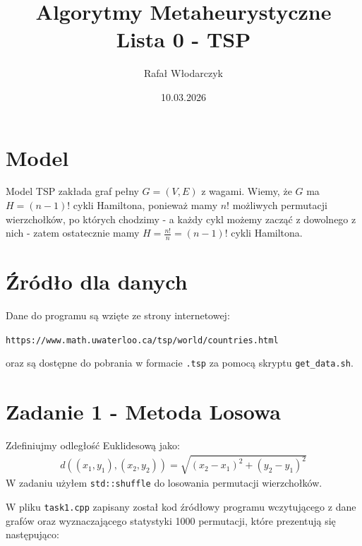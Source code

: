 \documentclass{article}
\title{Algorytmy Metaheurystyczne\\Lista 0 - TSP}
\author{Rafał Włodarczyk}
\date{10.03.2026}
\begin{document}
\maketitle

\tableofcontents

\section{Model}

Model TSP zakłada graf pełny $G=(V,E)$ z wagami. Wiemy, że $G$ ma $H=(n-1)!$ cykli Hamiltona, 
ponieważ mamy $n!$ możliwych permutacji wierzchołków, po których chodzimy - a każdy cykl możemy
zacząć z dowolnego z nich - zatem ostatecznie mamy $H=\frac{n!}{n}=(n-1)!$ cykli Hamiltona.

\section{Źródło dla danych}

Dane do programu są wzięte ze strony internetowej:
\begin{center}
\texttt{https://www.math.uwaterloo.ca/tsp/world/countries.html}
\end{center}
oraz są dostępne do pobrania w formacie \texttt{.tsp} za pomocą skryptu \texttt{get\_data.sh}.

\section{Zadanie 1 - Metoda Losowa}

Zdefiniujmy odległość Euklidesową jako:
\begin{align*}
    d((x_1, y_1), (x_2, y_2)) = \sqrt{(x_2 - x_1)^2 + (y_2 - y_1)^2}
\end{align*}
W zadaniu użyłem \texttt{std::shuffle} do losowania permutacji wierzchołków.

\noindent
W pliku \texttt{task1.cpp} zapisany został kod źródłowy programu 
wczytującego z dane grafów oraz wyznaczającego statystyki 1000 permutacji,
które prezentują się następująco:
\end{document}
